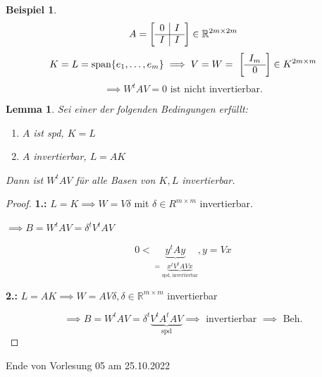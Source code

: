 \documentclass{book}
\newtheorem{lemma}[algorithm]{Lemma}
\newtheorem{example}[algorithm]{Beispiel}
\def\R{\mathbb{R}}
\begin{document}
            \begin{example}\label{b3.3}
                \[
                    A=\left[
                        \begin{array}{c|c}
                            0 & I\\\cline{1-2}
                            I & I
                        \end{array}
                    \right]\in\R^{2m\times 2m}
                \]
                \[
                    K=L=\text{span}\{e_1,\dots,e_m\}\implies V=W=\
                    \left[
                        \begin{array}{c}
                            I_m\\\cline{1-1}
                            0
                        \end{array}
                    \right]\in K^{2m\times m}
                \]
                \[\implies W^t A V =0 \text{ ist nicht invertierbar.}\]
            \end{example}

            \begin{lemma}\label{3.4}
                Sei einer der folgenden Bedingungen erfüllt:
                \begin{enumerate}
                    \item $A$ ist spd, $K=L$
                    \item $A$ invertierbar, $L=AK$
                \end{enumerate}
                Dann ist $W^tAV$ für alle Basen von $K,L$ invertierbar.
            \end{lemma}

            \begin{proof}
                \textbf{1.:} $L=K\implies W=V\delta$ mit $\delta \in R^{m\times m}$ invertierbar.

                $\implies B=W^tAV=\delta^tV^tAV$ %

                \[0<\underbrace{y^tAy}_{=\underbrace{x^tV^t A V x}_{\text{spd, invertierbar}}},y=Vx\]

                \textbf{2.:} $L=AK \implies W=AV\delta,\delta\in\R^{m\times m}$ invertierbar

                \[\implies B=W^tAV=\delta^t\underbrace{V^tA^tAV}_{\text{spd}} \implies\text{ invertierbar } \implies \text{ Beh.}\]
            \end{proof}

            \noindent
            \xrfill[0.7ex]{1pt}Ende von Vorlesung 05 am 25.10.2022\xrfill[0.7ex]{1pt}
        
\end{document}
